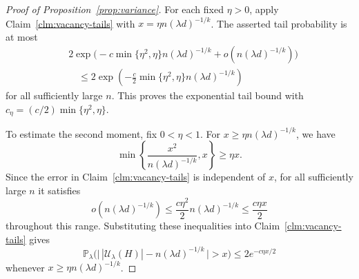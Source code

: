 \documentclass[11pt,reqno]{amsart}
\numberwithin{equation}{section}
\theoremstyle{plain}
\theoremstyle{definition}
\newcommand{\Prob}{\mathbb P}
\newcommand{\calU}{\mathcal U}
\begin{document}
\begin{proof}[Proof of Proposition~\ref{prop:variance}]
    For each fixed $\eta>0$, apply Claim~\ref{clm:vacancy-tails} with $x=\eta n(\lambda d)^{-1/k}$.
    The asserted tail probability is at most
    \[
        \begin{aligned}
            &2\exp\bigl(-c\min\{\eta^2,\eta\}n(\lambda d)^{-1/k}+o(n(\lambda d)^{-1/k})\bigr)\\
            &\quad\le2\exp\left(-\frac c2\min\{\eta^2,\eta\}n(\lambda d)^{-1/k}\right)
        \end{aligned}
    \]
    for all sufficiently large $n$.
    This proves the exponential tail bound with $c_\eta=(c/2)\min\{\eta^2,\eta\}$.

    To estimate the second moment, fix $0<\eta<1$.
    For $x\ge\eta n(\lambda d)^{-1/k}$, we have
    \[
        \min\left\{\frac{x^2}{n(\lambda d)^{-1/k}},x\right\}\ge\eta x.
    \]
    Since the error in Claim~\ref{clm:vacancy-tails} is independent of $x$, for all sufficiently large $n$ it satisfies
    \[
        o(n(\lambda d)^{-1/k})
        \le\frac{c\eta^2}{2}n(\lambda d)^{-1/k}
        \le\frac{c\eta x}{2}
    \]
    throughout this range.
    Substituting these inequalities into Claim~\ref{clm:vacancy-tails} gives
    \begin{equation}\label{eq:vacancy-integrable-tail}
        \Prob_\lambda\bigl(\bigl\lvert\,|\calU_\lambda(H)|-n(\lambda d)^{-1/k}\,\bigr\rvert>x\bigr)
        \le2e^{-c\eta x/2}
    \end{equation}
    whenever $x\ge\eta n(\lambda d)^{-1/k}$.


\end{proof}
\end{document}

